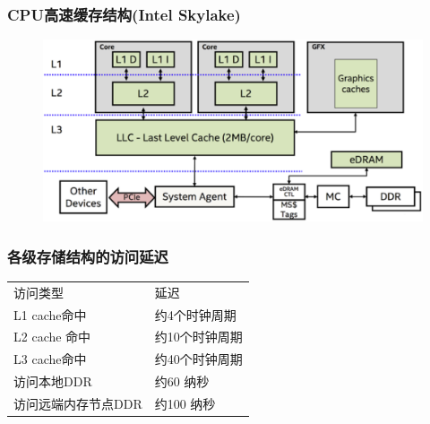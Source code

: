 % 
% 
% 
% 
\begin{frame}
    \frametitle{CPU高速缓存结构(Intel Skylake)}
	  	\begin{figure}
	  	\includegraphics[width=0.9\linewidth]{figs/cache-in-skylake.png}
	  	\end{figure}
\end{frame}
\begin{frame}
    \frametitle{各级存储结构的访问延迟}
\begin{table}[]
\begin{tabular}{|l|l|}
\cline{1-2}
访问类型        & 延迟        \\ \cline{1-2} 
L1 cache命中  & 约4个时钟周期  \\ \cline{1-2}
L2 cache 命中 & 约10个时钟周期 \\ \cline{1-2}
L3 cache命中  & 约40个时钟周期 \\ \cline{1-2}
访问本地DDR & 约60 纳秒 \\ \cline{1-2}
访问远端内存节点DDR & 约100 纳秒  \\ \cline{1-2}
\end{tabular}
\end{table}

\end{frame}
% 
